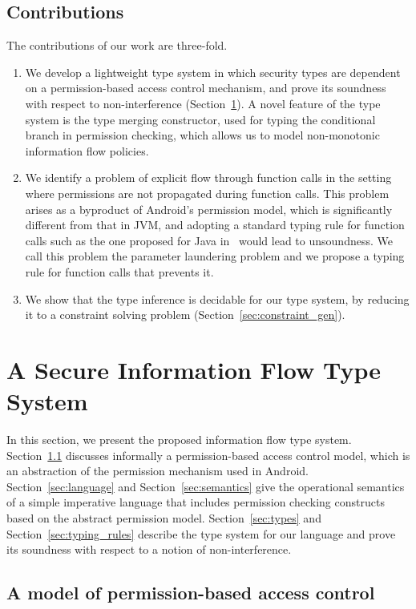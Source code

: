 \subsection{Contributions}
The contributions of our work are three-fold.
\begin{enumerate}\item We develop a lightweight type system in which security types are dependent on a permission-based access control mechanism, and prove its soundness with respect to non-interference (Section~\ref{sec:type_system}). A novel feature of the type system is the type merging constructor, used for typing the conditional branch in permission checking, which allows us to model non-monotonic information flow policies.
	\item We identify a problem of explicit flow through function calls in the setting where permissions are not propagated during function calls. This problem
	arises as a byproduct of Android's permission model, which is significantly different from that in JVM, and adopting a standard typing rule for function calls such as the one proposed for Java in~\cite{Banerjee:2005ht} 
	would lead to unsoundness. We call this problem the parameter laundering problem and we propose a typing rule for function calls that prevents it.
	\item We show that the type inference is decidable for our type system, by reducing it to a constraint solving problem (Section~\ref{sec:constraint_gen}).
\end{enumerate}
 \section{A Secure Information Flow Type System}\label{sec:type_system}

In this section, we present the proposed information flow type system. Section~\ref{sec:permission_model} discusses informally a permission-based access control model, which is an abstraction of the permission mechanism used in Android.
Section~\ref{sec:language} and Section~\ref{sec:semantics} give the operational semantics of a simple imperative language that includes permission checking
constructs based on the abstract permission model.
Section~\ref{sec:types} and Section~\ref{sec:typing_rules} describe the type system for our language and prove its soundness with respect to a notion of non-interference.

\subsection{A model of permission-based access control}
\label{sec:permission_model}

